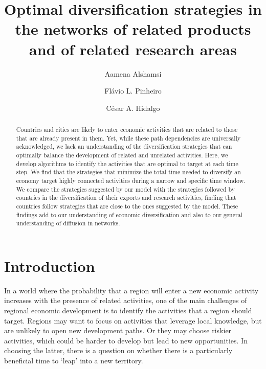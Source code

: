 \documentclass[preprint,superscriptaddress,floatfix]{article}
\begin{document}
\title{Optimal diversification strategies in the networks of related products and of related research areas}
\author[1,2,*]{Aamena Alshamsi}
\author[1,*]{Fl\'avio L. Pinheiro}
\author[1]{C\'esar A. Hidalgo}

\maketitle

\begin{abstract}
Countries and cities are likely to enter economic activities that are related to those that are already present in them. Yet, while these path dependencies are universally acknowledged, we lack an understanding of the diversification strategies that can optimally balance the development of related and unrelated activities. Here, we develop algorithms to identify the activities that are optimal to target at each time step. We find that the strategies that minimize the total time needed to diversify an economy target highly connected activities during a narrow and specific time window. We compare the strategies suggested by our model with the strategies followed by countries in the diversification of their exports and research activities, finding that countries follow strategies that are close to the ones suggested by the model. These findings add to our understanding of economic diversification and also to our general understanding of diffusion in networks.
\end{abstract}

\section*{Introduction}

In a world where the probability that a region will enter a new economic activity increases with the presence of related activities, one of the main challenges of regional economic development is to identify the activities that a region should target. Regions may want to focus on activities that leverage local knowledge, but are unlikely to open new development paths. Or they may choose riskier activities, which could be harder to develop but lead to new opportunities. In choosing the latter, there is a question on whether there is a particularly beneficial time to ‘leap’ into a new territory.
\end{document}
